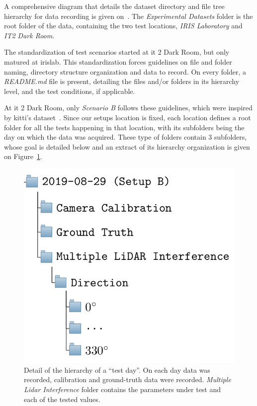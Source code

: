 A comprehensive diagram that details the dataset directory and file tree hierarchy for data recording is given on~. The \textit{Experimental Datasets} folder is the root folder of the data, containing the two test locations, \textit{IRIS Laboratory} and \textit{IT2 Dark Room}. 

The standardization of test scenarios started at \ac{it} 2 Dark Room, but only matured at \ac{irislab}. This standardization forces guidelines on file and folder naming, directory structure organization and data to record. On every folder, a \textit{README.md} file is present, detailing the files and/or folders in its hierarchy level, and the test conditions, if applicable. 

At \ac{it} 2 Dark Room, only \textit{Scenario B} follows these guidelines, which were inspired by \ac{kitti}'s dataset~\cite{Geiger2013a}. Since our setups location is fixed, each location defines a root folder for all the tests happening in that location, with its subfolders being the day on which the data was acquired. These type of folders contain  3 subfolders, whose goal is detailed below and an extract of its  hierarchy organization is given on Figure~\ref{fig:test-subfolders}.

\begin{figure}[!ht]
\centering
\includegraphics[scale=0.3]{img/datasets/test-subfolders.png}
\caption[Dataset folder hierarchy for a ``test day''.]{Detail of the hierarchy of a ``test day''. On each day data was recorded, calibration and ground-truth data were recorded. \textit{Multiple Lidar Interference} folder contains the parameters under test and each of the tested values.}
\label{fig:test-subfolders}
\end{figure}



